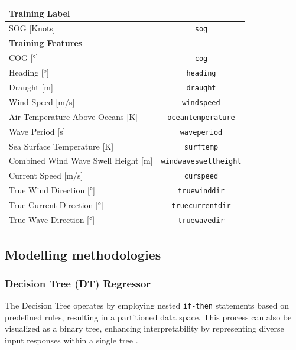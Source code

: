 \documentclass[]{interact}
\theoremstyle{plain}%
\theoremstyle{definition}
\theoremstyle{remark}
\begin{document}
\begin{table}
  {\begin{tabular}{ p{8cm}c }
  \hline
  \multicolumn{2}{l}{\textbf{Training Label}}\\
  \hline
  SOG [Knots] & {\tt sog} \\
  \hline
  \multicolumn{2}{l}{\textbf{Training Features}}\\
  \hline
  COG [°] & {\tt cog}  \\
  Heading [°] & {\tt heading}  \\
  Draught [m] & {\tt draught} \\
  Wind Speed [m/s] & {\tt windspeed} \\
  Air Temperature Above Oceans [K] & {\tt oceantemperature} \\
  Wave Period [s] & {\tt waveperiod}\\
  Sea Surface Temperature [K] & {\tt surftemp}\\
  Combined Wind Wave Swell Height [m] &  {\tt windwaveswellheight} \\
  Current Speed [m/s] & {\tt curspeed} \\
  True Wind Direction [°] & {\tt truewinddir}  \\
  True Current Direction [°] & {\tt truecurrentdir} \\
  True Wave Direction [°] & {\tt truewavedir} \\
  \hline
  \end{tabular}}
\label{tbl:struct_train_final}
\end{table}

\subsection{Modelling methodologies}\label{sec:tree_model_development}

\subsubsection{Decision Tree (DT) Regressor}\label{sec:dt_theo_j}

The Decision Tree operates by employing nested {\tt if-then} statements based on predefined rules, resulting in a partitioned data space. This process can also be visualized as a binary tree, enhancing interpretability by representing diverse input responses within a single tree \citet{Kuhn.2013, Hastie.2009}.
\end{document}
